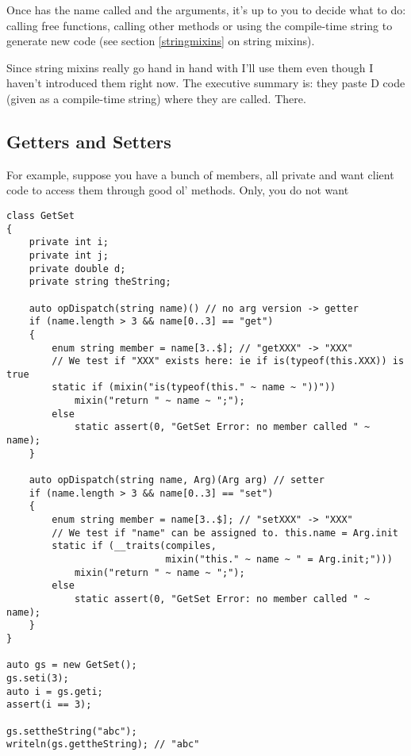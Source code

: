Once  has the name called and the arguments, it's up to you to decide what to do: calling free functions, calling other methods or using the compile-time string to generate new code (see section \ref{stringmixins} on string mixins).

Since string mixins really go hand in hand with  I'll use them even though I haven't introduced them right now. The executive summary is: they paste D code (given as a compile-time string) where they are called. There.

\subsection{Getters and Setters}\label{opdispatchgetterssetters}

For example, suppose you have a bunch of members, all private and want client code to access them through good ol'  methods. Only, you do not want

\begin{verbatim}
class GetSet
{
    private int i;
    private int j;
    private double d;
    private string theString;

    auto opDispatch(string name)() // no arg version -> getter
    if (name.length > 3 && name[0..3] == "get")
    {
        enum string member = name[3..$]; // "getXXX" -> "XXX"
        // We test if "XXX" exists here: ie if is(typeof(this.XXX)) is true
        static if (mixin("is(typeof(this." ~ name ~ "))"))
            mixin("return " ~ name ~ ";");
        else
            static assert(0, "GetSet Error: no member called " ~ name);
    }

    auto opDispatch(string name, Arg)(Arg arg) // setter
    if (name.length > 3 && name[0..3] == "set")
    {
        enum string member = name[3..$]; // "setXXX" -> "XXX"
        // We test if "name" can be assigned to. this.name = Arg.init
        static if (__traits(compiles, 
                            mixin("this." ~ name ~ " = Arg.init;")))
            mixin("return " ~ name ~ ";");
        else
            static assert(0, "GetSet Error: no member called " ~ name);
    }
}

auto gs = new GetSet();
gs.seti(3);
auto i = gs.geti;
assert(i == 3);

gs.settheString("abc");
writeln(gs.gettheString); // "abc"
\end{verbatim}

